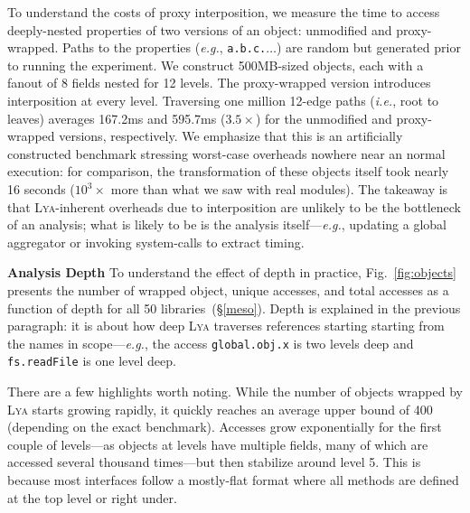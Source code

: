 \documentclass[letterpaper,twocolumn,10pt]{article}
\def\eg{{\em e.g.}, }
\def\ie{{\em i.e.}, }
\newcommand{\heading}[1]{\vspace{2pt}\noindent\textbf{#1}\enspace}
\newcommand{\ttt}[1]{\texttt{#1}}
\newcommand{\sx}[1]{(\S\ref{#1})}
\newcommand{\sys}{{\scshape Lya}\xspace}
\begin{document}
To understand the costs of proxy interposition, we measure the time to access deeply-nested properties of two versions of an object:
  unmodified and proxy-wrapped.
Paths to the properties (\eg \ttt{a.b.c.$\ldots$}) are random but generated prior to running the experiment.
We construct 500MB-sized objects, each with a fanout of 8 fields nested for 12 levels.
The proxy-wrapped version introduces interposition at every level.
Traversing one million 12-edge paths (\ie root to leaves) averages 167.2ms and 595.7ms ($3.5\times$) for the unmodified and proxy-wrapped versions, respectively.
% 
We emphasize that this is an artificially constructed benchmark stressing worst-case overheads nowhere near an normal execution:
  for comparison, the transformation of these objects itself took nearly 16 seconds ($10^3\times$ more than what we saw with real modules).
The takeaway is that \sys-inherent overheads due to interposition are unlikely to be the bottleneck of an analysis;
  what is likely to be is the analysis itself---\eg updating a global aggregator or invoking system-calls to extract timing.

\heading{Analysis Depth}
To understand the effect of depth in practice, Fig.~\ref{fig:objects} presents the number of wrapped object, unique accesses, and total accesses as a function of depth for all 50 libraries~\sx{meso}.
Depth is explained in the previous paragraph:
   it is about how deep \sys traverses references starting starting from the names in scope---\eg the access \ttt{global.obj.x} is two levels deep and \ttt{fs.readFile} is one level deep.

There are a few highlights worth noting.
While the number of objects wrapped by \sys starts growing rapidly, it quickly reaches an average upper bound of 400 (depending on the exact benchmark).
Accesses grow exponentially for the first couple of levels---as objects at levels have multiple fields, many of which are accessed several thousand times---but then stabilize around level 5.
This is because most interfaces follow a mostly-flat format where all methods are defined at the top level or right under.
\end{document}
